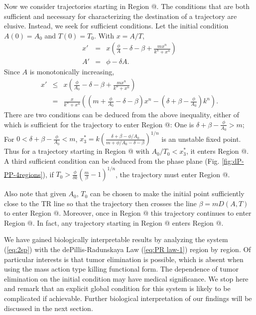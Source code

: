 \documentclass[review,authoryear]{elsarticle}
\makeatletter
\newcommand*{\rom}[1]{\expandafter\@slowromancap\romannumeral #1@}
\makeatother
\begin{document}
Now we consider trajectories starting in Region \rom{3}.  The conditions that are both sufficient and necessary for characterizing the destination of a trajectory are elusive.
Instead, we seek for sufficient conditions. Let the initial condition $A(0)=A_0$ and $T(0)=T_0$.
With $x=A/T$, 
\begin{eqnarray*}
x' & = & x(\frac{\phi}{A}-\delta-\beta+\frac{mx^{n}}{k^{n}+x^{n}})\\
A' & = & \phi-\delta A.
\end{eqnarray*}
Since $A$ is monotonically increasing,
\begin{eqnarray*}
x' & \le & x(\frac{\phi}{A_{0}}-\delta-\beta+\frac{mx^{n}}{k^{n}+x^{n}})\\
   & = & \frac{x}{k^{n}+x^{n}}((m+\frac{\phi}{A_{0}}-\delta-\beta)x^{n}-(\delta+\beta-\frac{\phi}{A_{0}})k^{n}).
\end{eqnarray*}
There are two conditions can be deduced from the above inequality, either of which is sufficient for the trajectory
to enter Region \rom{2}: One is $\delta+\beta-\frac{\phi}{A_{0}}>m$; For $0<\delta+\beta-\frac{\phi}{A_{0}}<m$,
$x_{3}^{*}=k(\frac{\delta+\beta-\phi/A_{0}}{m+\phi/A_{0}-\delta-\beta})^{1/n}$ is an unstable fixed point. Thus for a trajectory starting in Region \rom{3} with $A_0/T_0<x_{3}^{*}$,
it enters Region \rom{2}. A third sufficient condition can be deduced from the phase plane (Fig. \ref{fig:dP-PP-4regions}), if $T_0>\frac{\phi}{\delta k}(\frac{m}{\beta}-1)^{1/n}$, the trajectory must enter Region \rom{2}. 

Also note that given $A_0$, $T_0$ can be chosen to make the initial point sufficiently close to the TR line so that the trajectory then crosses the line $\beta=mD(A,T)$
to enter Region \rom{4}. Moreover, once in Region \rom{4} this trajectory continues to enter Region \rom{1}. In fact, any trajectory starting in Region \rom{4} enters Region \rom{1}. 

We have gained biologically interpretable results by analyzing the system (\ref{eq:2sp}) with the dePillis-Radunskaya Law (\ref{eq:PR law-1}) region by region.  Of particular interests is that tumor elimination is possible, which is absent when using the mass action type killing functional form. The dependence of tumor elimination on the initial condition may have medical significance. We stop here and remark that an explicit global condition for this system is likely to be complicated if achievable. Further biological interpretation of our findings will be discussed in the next section.
\end{document}
